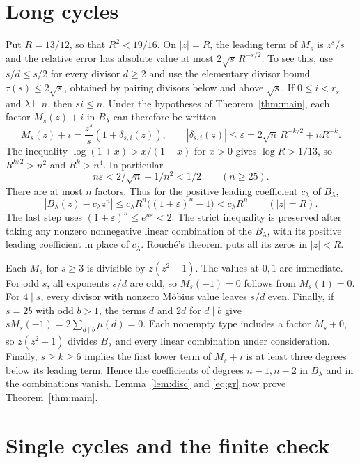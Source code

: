 \documentclass[11pt]{article}
\begin{document}
\section{Long cycles}

Put $R=13/12$, so that $R^2<19/16$. On $|z|=R$, the leading term
of $M_s$ is $z^s/s$ and the relative error has absolute value at
most $2\sqrt{s}\,R^{-s/2}$. To see this, use $s/d\le s/2$ for
every divisor $d\ge2$ and use the elementary divisor bound
$\tau(s)\le2\sqrt{s}$, obtained by pairing divisors below and above
$\sqrt{s}$. If $0\le i<r_s$ and $\lambda\vdash n$, then $si\le n$.
Under the hypotheses of Theorem~\ref{thm:main}, each factor
$M_s(z)+i$ in $B_\lambda$ can therefore be written
\[
M_s(z)+i=\frac{z^s}s(1+\delta_{s,i}(z)),\qquad
|\delta_{s,i}(z)|\le
 \varepsilon=2\sqrt n\,R^{-k/2}+nR^{-k}.
\]
The inequality $\log(1+x)>x/(1+x)$ for $x>0$ gives
$\log R>1/13$, so $R^{k/2}>n^2$ and $R^k>n^4$. In particular
\[
n\varepsilon<2/\sqrt n+1/n^2<1/2\qquad(n\ge25).
\]
There are at most $n$ factors. Thus for the positive leading
coefficient $c_\lambda$ of $B_\lambda$,
\begin{equation}\label{eq:rouche}
|B_\lambda(z)-c_\lambda z^n|
   \le c_\lambda R^n\bigl((1+\varepsilon)^n-1\bigr)
   <c_\lambda R^n
\qquad (|z|=R).
\end{equation}
The last step uses $(1+\varepsilon)^n\le e^{n\varepsilon}<2$.
The strict inequality is preserved after taking any nonzero
nonnegative linear combination of the $B_\lambda$, with its
positive leading coefficient in place of $c_\lambda$.
Rouch\'e's theorem puts all its zeros in $|z|<R$.

Each $M_s$ for $s\ge3$ is divisible by $z(z^2-1)$. The values at
$0,1$ are immediate. For odd $s$, all exponents $s/d$ are odd, so
$M_s(-1)=0$ follows from $M_s(1)=0$. For $4\mid s$, every divisor with
nonzero M\"obius value leaves $s/d$ even. Finally, if $s=2b$ with odd
$b>1$, the terms $d$ and $2d$ for $d\mid b$ give
$sM_s(-1)=2\sum_{d\mid b}\mu(d)=0$.
Each nonempty type includes a factor $M_s+0$, so $z(z^2-1)$ divides
$B_\lambda$ and every linear combination under consideration.
Finally, $s\ge k\ge6$ implies the first lower term of $M_s+i$ is at
least three degrees below its leading term. Hence the coefficients
of degrees $n-1,n-2$ in $B_\lambda$ and in the combinations vanish.
Lemma~\ref{lem:disc} and \eqref{eq:gr} now prove
Theorem~\ref{thm:main}.

\section{Single cycles and the finite check}
\end{document}
